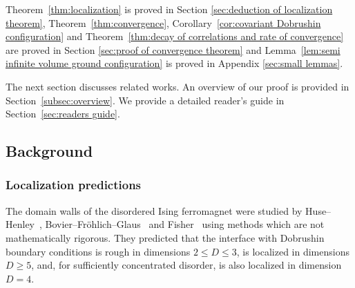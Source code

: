 \documentclass[11pt, reqno]{amsart}
\numberwithin{equation}{section}
\begin{document}
Theorem~\ref{thm:localization} is proved in Section \ref{sec:deduction of localization theorem}, Theorem~\ref{thm:convergence}, Corollary~\ref{cor:covariant Dobrushin configuration} and Theorem~\ref{thm:decay of correlations and rate of convergence} are proved in Section \ref{sec:proof of convergence theorem} and Lemma~\ref{lem:semi infinite volume ground configuration} is proved in Appendix \ref{sec:small lemmas}.

The next section discusses related works. An overview of our proof is provided in Section~\ref{subsec:overview}. We provide a detailed reader's guide in Section~\ref{sec:readers guide}.

\subsection{Background}\label{sec:background}

\subsubsection{Localization predictions} The domain walls of the disordered Ising ferromagnet were studied by Huse--Henley~\cite{HH85}, Bovier--Fr\"ohlich--Glaus~\cite{BFG86} and Fisher~\cite{F86} using methods which are not mathematically rigorous. They predicted that the interface with Dobrushin boundary conditions is rough in dimensions $2\le D \le 3$, is localized in dimensions $D\ge 5$, and, for sufficiently concentrated disorder, is also localized in dimension $D=4$.
\end{document}
